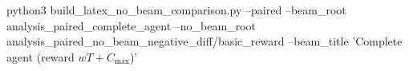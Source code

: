 python3 build_latex_no_beam_comparison.py --paired --beam_root analysis_paired_complete_agent --no_beam_root analysis_paired_no_beam_negative_diff/basic_reward --beam_title 'Complete agent (reward $wT + C_{\max}$)'
